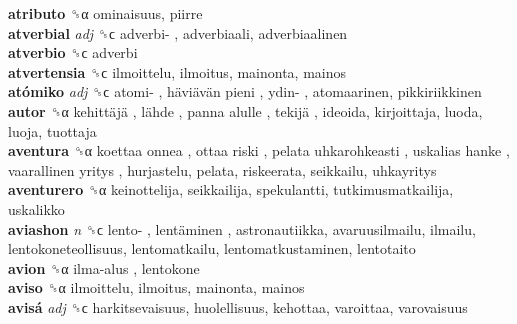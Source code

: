 \textbf{atributo} ␝α  ominaisuus, piirre  \\
\textbf{atverbial} \emph{adj}  ␝ϲ   adverbi- , adverbiaali, adverbiaalinen  \\
\textbf{atverbio} ␝ϲ  adverbi  \\
\textbf{atvertensia} ␝ϲ  ilmoittelu, ilmoitus, mainonta, mainos  \\
\textbf{atómiko} \emph{adj}  ␝ϲ   atomi- ,  häviävän pieni ,  ydin- , atomaarinen, pikkiriikkinen  \\
\textbf{autor} ␝α   kehittäjä ,  lähde ,  panna alulle ,  tekijä , ideoida, kirjoittaja, luoda, luoja, tuottaja  \\
\textbf{aventura} ␝α   koettaa onnea ,  ottaa riski ,  pelata uhkarohkeasti ,  uskalias hanke ,  vaarallinen yritys , hurjastelu, pelata, riskeerata, seikkailu, uhkayritys  \\
\textbf{aventurero} ␝α  keinottelija, seikkailija, spekulantti, tutkimusmatkailija, uskalikko  \\
\textbf{aviashon} \emph{n}  ␝ϲ   lento- ,  lentäminen , astronautiikka, avaruusilmailu, ilmailu, lentokoneteollisuus, lentomatkailu, lentomatkustaminen, lentotaito  \\
\textbf{avion} ␝α   ilma-alus , lentokone  \\
\textbf{aviso} ␝α  ilmoittelu, ilmoitus, mainonta, mainos  \\
\textbf{avisá} \emph{adj}  ␝ϲ  harkitsevaisuus, huolellisuus, kehottaa, varoittaa, varovaisuus  \\
